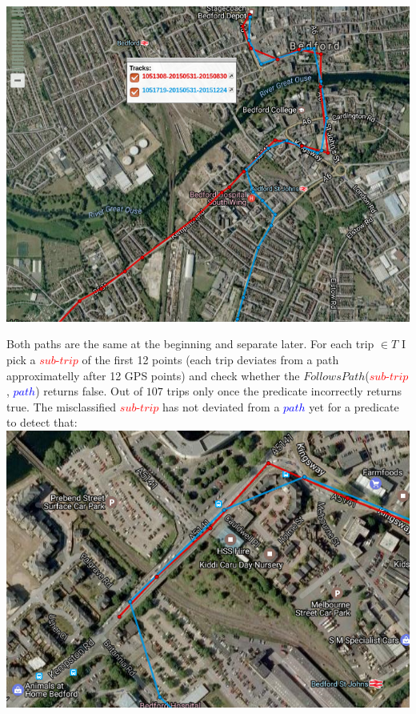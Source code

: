 \documentclass[12pt,a4paper,oneside,openright]{report}
\begin{document}
\includegraphics[scale = 0.6]{figs/similar_paths.png}

Both paths are the same at the beginning and separate later. For each
trip $\in T$ I pick a \textcolor{red}{$sub$-$trip$} of the first 12
points (each trip deviates from a path approximatelly after 12 GPS
points) and check whether the
$FollowsPath$(\textcolor{red}{$sub$-$trip$}, \textcolor{blue}{$path$}) 
returns false. Out of $107$ trips only once the predicate incorrectly returns
true. The misclassified \textcolor{red}{$sub$-$trip$} has not deviated from a
\textcolor{blue}{$path$} yet for a predicate to detect that: \\

\includegraphics[scale = 0.6]{figs/misclassified_trip.png}
\end{document}
